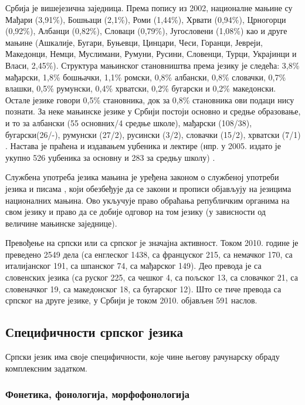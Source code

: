 \begin{multicols}{2}
Србија је вишејезична заједница. Према попису из 2002, националне мањине \cite{Ombudsman} су Мађари (3,91\%), Бошњаци (2,1\%), Роми (1,44\%), Хрвати (0,94\%), Црногорци (0,92\%), Албанци (0,82\%), Словаци (0,79\%), Југословени (1,08\%) као и друге мањине (Ашкалије, Бугари, Буњевци, Цинцари, Чеси, Горанци, Јевреји, Македонци, Немци, Муслимани, Румуни, Русини, Словенци, Турци, Украјинци и Власи, 2,45\%).  Структура мањинског становништва према језику је следећа: 3,8\% мађарски, 1,8\% бошњачки, 1,1\% ромски, 0,8\% албански, 0,8\% словачки, 0,7\% влашки, 0,5\% румунски, 0,4\% хрватски, 0,2\% бугарски и 0,2\% македонски. Остале језике говори 0,5\% становника, док за 0,8\% становника ови подаци нису познати. За неке мањинске језике у Србији постоји основно и средње образовање, и то за албански (55 основних/4 средње школе), мађарски (108/38), бугарски(26/-), румунски (27/2), русински (3/2), словачки (15/2), хрватски (7/1) \cite{GOD2010}. Настава је праћена и издавањем уџбеника и лектире (нпр. у 2005. издато је укупно 526 уџбеника за основну и 283 за средњу  школу) \cite{HDR}. 

Службена употреба језика мањина је уређена законом о службеној употреби језика и писама \cite{SGRS}, који обезбеђује да се закони и прописи објављују на језицима националних мањина. Ово укључује право обраћања републичким органима на свом језику и право да се добије одговор на том језику (у зависности од величине мањинске заједнице). 

Превођење на српски или са српског је значајна активност. Током 2010. године је преведено 2549 дела (са енглеског 1438, са француског 215, са немачког 170, са италијанског 191, са шпанског 74, са мађарског 149). Део превода је са словенских језика (са руског 225, са чешког 4, са пољског 13, са словачког 21, са словеначког 19, са македонског 18, са бугарског 12). Што се тиче превода са српског на друге језике, у Србији је током 2010. објављен 591 наслов.

\subsection {Специфичности српског језика}
  
Српски језик има своје специфичности, које чине његову рачунарску обраду комплексним задатком. 


\subsubsection {Фонетика, фонологија, морфофонологија}
  

\end{multicols}
